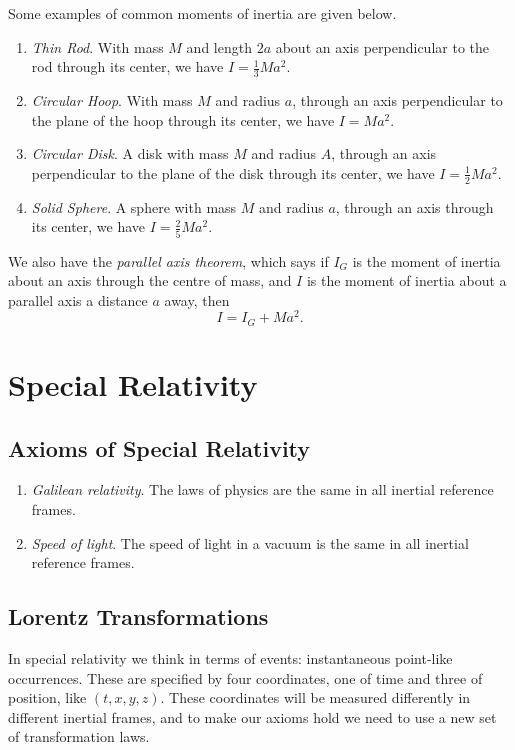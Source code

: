\documentclass[11pt, a4paper]{scrartcl}
\theoremstyle{definition}
\begin{document}
Some examples of common moments of inertia are given below.
\begin{enumerate}
	\item \emph{Thin Rod}. With mass $M$ and length $2a$ about an axis perpendicular to the rod through its center, we have $I = \frac{1}{3}M a^2$.
	\item \emph{Circular Hoop}. With mass $M$ and radius $a$, through an axis perpendicular to the plane of the hoop through its center, we have $I = Ma^2$.
	\item \emph{Circular Disk}. A disk with mass $M$ and radius $A$, through an axis perpendicular to the plane of the disk through its center, we have $I = \frac{1}{2}Ma^2$.
	\item \emph{Solid Sphere}. A sphere with mass $M$ and radius $a$, through an axis through its center, we have $I = \frac{2}{5}Ma^2$. 
\end{enumerate}

We also have the \emph{parallel axis theorem}, which says if $I_G$ is the moment of inertia about an axis through the centre of mass, and $I$ is the moment of inertia about a parallel axis a distance $a$ away, then
$$
I= I_G + Ma^2.
$$



\clearpage

\section{Special Relativity}


\subsection*{Axioms of Special Relativity}

\begin{enumerate}
	\item \emph{Galilean relativity}. The laws of physics are the same in all inertial reference frames.
	\item \emph{Speed of light}. The speed of light in a vacuum is the same in all inertial reference frames.
\end{enumerate}


\subsection*{Lorentz Transformations}

In special relativity we think in terms of events: instantaneous point-like occurrences. These are specified by four coordinates, one of time and three of position, like $(t, x, y, z)$.
These coordinates will be measured differently in different inertial frames, and to make our axioms hold we need to use a new set of transformation laws.
\end{document}
